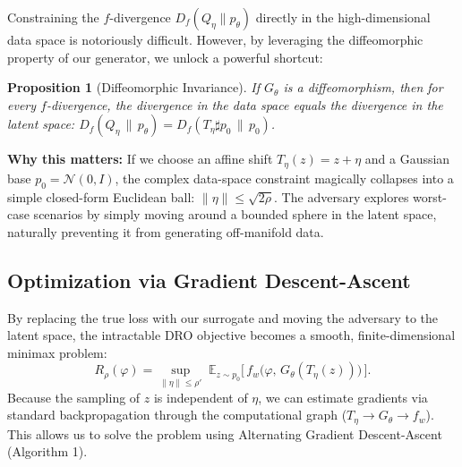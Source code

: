 \documentclass[11pt]{article}
\newtheorem{proposition}{Proposition}
\newcommand{\E}{\mathbb{E}}
\newcommand{\design}{\varphi}
\newcommand{\latent}{z}
\newcommand{\surr}{f_w}
\newcommand{\gendist}{p_\theta}
\newcommand{\base}{p_0}
\newcommand{\Div}{D_f}
\begin{document}
Constraining the $f$-divergence $\Div(Q_\eta \| \gendist)$ directly in the high-dimensional data space is notoriously difficult. However, by leveraging the diffeomorphic property of our generator, we unlock a powerful shortcut:

\begin{proposition}[Diffeomorphic Invariance]
\label{prop:invariance}
If $G_\theta$ is a diffeomorphism, then for every $f$-divergence, the divergence in the data space equals the divergence in the latent space:
$\Div(Q_\eta \,\|\, \gendist) = \Div(T_\eta\sharp\base \,\|\, \base)$.
\end{proposition}

\textbf{Why this matters:} If we choose an affine shift $T_\eta(\latent) = \latent + \eta$ and a Gaussian base $\base = \mathcal N(0,I)$, the complex data-space constraint magically collapses into a simple closed-form Euclidean ball: $\|\eta\| \le \sqrt{2\rho}$. The adversary explores worst-case scenarios by simply moving around a bounded sphere in the latent space, naturally preventing it from generating off-manifold data.

\subsection{Optimization via Gradient Descent-Ascent}
By replacing the true loss with our surrogate and moving the adversary to the latent space, the intractable DRO objective becomes a smooth, finite-dimensional minimax problem:
\begin{equation}
  \label{eq:inner}
  R_\rho(\design) = \sup_{\|\eta\| \le \rho'} \; \E_{\latent \sim \base}\Big[\, \surr\big(\design,\, G_\theta(T_\eta(\latent))\big) \,\Big].
\end{equation}
Because the sampling of $\latent$ is independent of $\eta$, we can estimate gradients via standard backpropagation through the computational graph ($T_\eta \to G_\theta \to \surr$). This allows us to solve the problem using Alternating Gradient Descent-Ascent (Algorithm 1).
\end{document}
